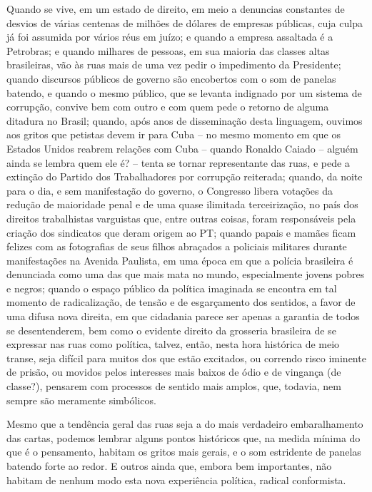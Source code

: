 Quando se vive, em um estado de direito, em meio a denuncias constantes
de desvios de várias centenas de milhões de dólares de empresas
públicas, cuja culpa já foi assumida por vários réus em juízo; e quando
a empresa assaltada é a Petrobras; e quando milhares de pessoas, em sua
maioria das classes altas brasileiras, vão às ruas mais de uma vez pedir
o impedimento da Presidente; quando discursos públicos de governo são
encobertos com o som de panelas batendo, e quando o mesmo público, que
se levanta indignado por um sistema de corrupção, convive bem com outro
e com quem pede o retorno de alguma ditadura no Brasil; quando, após
anos de disseminação desta linguagem, ouvimos aos gritos que petistas
devem ir para Cuba -- no mesmo momento em que os Estados Unidos reabrem
relações com Cuba -- quando Ronaldo Caiado -- alguém ainda se lembra
quem ele é? -- tenta se tornar representante das ruas, e pede a extinção
do Partido dos Trabalhadores por corrupção reiterada; quando, da noite
para o dia, e sem manifestação do governo, o Congresso libera votações
da redução de maioridade penal e de uma quase ilimitada terceirização,
no país dos direitos trabalhistas varguistas que, entre outras coisas,
foram responsáveis pela criação dos sindicatos que deram origem ao PT;
quando papais e mamães ficam felizes com as fotografias de seus filhos
abraçados a policiais militares durante manifestações na Avenida
Paulista, em uma época em que a polícia brasileira é denunciada como uma
das que mais mata no mundo, especialmente jovens pobres e negros; quando
o espaço público da política imaginada se encontra em tal momento de
radicalização, de tensão e de esgarçamento dos sentidos, a favor de uma
difusa nova direita, em que cidadania parece ser apenas a garantia de
todos se desentenderem, bem como o evidente direito da grosseria
brasileira de se expressar nas ruas como política, talvez, então, nesta
hora histórica de meio transe, seja difícil para muitos dos que estão
excitados, ou correndo risco iminente de prisão, ou movidos pelos
interesses mais baixos de ódio e de vingança (de classe?), pensarem com
processos de sentido mais amplos, que, todavia, nem sempre são meramente
simbólicos.

Mesmo que a tendência geral das ruas seja a do mais verdadeiro
embaralhamento das cartas, podemos lembrar alguns pontos históricos que,
na medida mínima do que é o pensamento, habitam os gritos mais gerais, e
o som estridente de panelas batendo forte ao redor. E outros ainda que,
embora bem importantes, não habitam de nenhum modo esta nova experiência
política, radical conformista.

